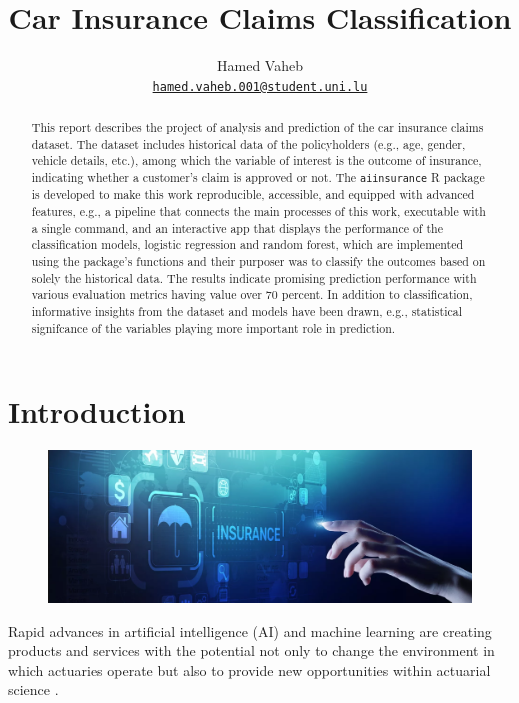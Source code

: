 \documentclass{article}
\title{\color{astral}Car Insurance Claims Classification}
\author{
    Hamed Vaheb\\
  \texttt{\href{mailto:hamed.vaheb.001@student.uni.lu}{\nolinkurl{hamed.vaheb.001@student.uni.lu}}}%
  }
\begin{document}
\maketitle


\begin{abstract}
This report describes the project of analysis and prediction of the car
insurance claims dataset. The dataset includes historical data of the
policyholders (e.g., age, gender, vehicle details, etc.), among which
the variable of interest is the outcome of insurance, indicating whether
a customer's claim is approved or not. The \texttt{aiinsurance} R
package \cite{package} is developed to make this work reproducible,
accessible, and equipped with advanced features, e.g., a pipeline that
connects the main processes of this work, executable with a single
command, and an interactive app that displays the performance of the
classification models, logistic regression and random forest, which are
implemented using the package's functions and their purposer was to
classify the outcomes based on solely the historical data. The results
indicate promising prediction performance with various evaluation
metrics having value over 70 percent. In addition to classification,
informative insights from the dataset and models have been drawn, e.g.,
statistical signifcance of the variables playing more important role in
prediction.
\end{abstract}


\hypertarget{introduction}{%
\section{Introduction}\label{introduction}}

\begin{figure}
\includegraphics[width=0.9\linewidth]{./figures/aiactuary.png}
\end{figure}

Rapid advances in artificial intelligence (AI) and machine learning are
creating products and services with the potential not only to change the
environment in which actuaries operate but also to provide new
opportunities within actuarial science \cite{aiinins}.
\end{document}
